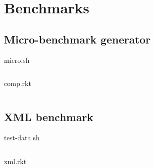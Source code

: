 \chapter{Benchmarks}
\label{chap:benchmarks}

\section{Micro-benchmark generator}
micro.sh
\inputminted{bash}{listings/micro.sh}
\noindent
comp.rkt
\inputminted{racket}{listings/comp.rkt}

\section{XML benchmark}
test-data.sh
\inputminted{bash}{listings/test-data.sh}
\noindent
xml.rkt
\inputminted{racket}{listings/xml.rkt}
